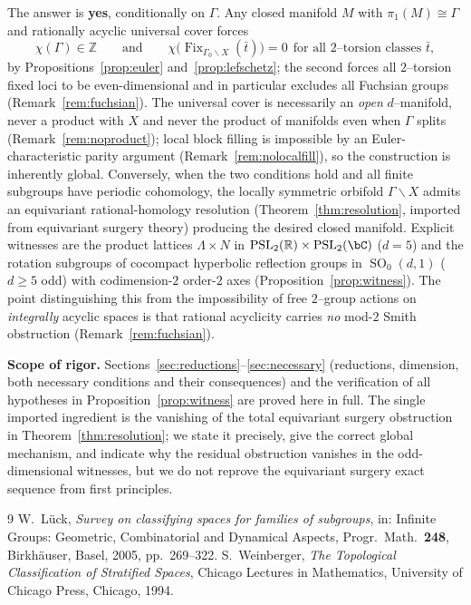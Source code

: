 \documentclass[12pt]{article}
\newcommand{\bR}{\mathbb{R}}
\newcommand{\bZ}{\mathbb{Z}}
\newcommand{\Fix}{\operatorname{Fix}}
\DeclareMathOperator{\SO}{SO}
\DeclareMathOperator{\PSL}{PSL}
\theoremstyle{definition}
\begin{document}
The answer is \textbf{yes}, conditionally on $\Gamma$.  Any closed manifold $M$
with $\pi_1(M)\cong\Gamma$ and rationally acyclic universal cover forces
\[
   \chi(\Gamma)\in\bZ
   \qquad\text{and}\qquad
   \chi\bigl(\Fix_{\Gamma_0\backslash X}(\bar t)\bigr)=0\ \ \text{for all
   $2$--torsion classes }\bar t,
\]
by Propositions~\ref{prop:euler} and~\ref{prop:lefschetz}; the second forces all
$2$--torsion fixed loci to be even-dimensional and in particular excludes all
Fuchsian groups (Remark~\ref{rem:fuchsian}).  The universal cover is necessarily
an \emph{open} $d$--manifold, never a product with $X$ and never the product of
manifolds even when $\Gamma$ splits (Remark~\ref{rem:noproduct}); local block
filling is impossible by an Euler-characteristic parity argument
(Remark~\ref{rem:nolocalfill}), so the construction is inherently global.
Conversely, when the two conditions hold and all finite subgroups have periodic
cohomology, the locally symmetric orbifold $\Gamma\backslash X$ admits an
equivariant rational-homology resolution (Theorem~\ref{thm:resolution}, imported
from equivariant surgery theory) producing the desired closed manifold.  Explicit
witnesses are the product lattices $\Lambda\times N$ in
$\PSL_2(\bR)\times\PSL_2(\bC)$ ($d=5$) and the rotation subgroups of cocompact
hyperbolic reflection groups in $\SO_0(d,1)$ ($d\ge5$ odd) with codimension-$2$
order-$2$ axes (Proposition~\ref{prop:witness}).  The point distinguishing this
from the impossibility of free $2$--group actions on \emph{integrally} acyclic
spaces is that rational acyclicity carries \emph{no} mod-$2$ Smith obstruction
(Remark~\ref{rem:fuchsian}).

\medskip
\noindent\textbf{Scope of rigor.}  Sections~\ref{sec:reductions}--\ref{sec:necessary}
(reductions, dimension, both necessary conditions and their consequences) and the
verification of all hypotheses in Proposition~\ref{prop:witness} are proved here
in full.  The single imported ingredient is the vanishing of the total equivariant
surgery obstruction in Theorem~\ref{thm:resolution}; we state it precisely, give
the correct global mechanism, and indicate why the residual obstruction vanishes
in the odd-dimensional witnesses, but we do not reprove the equivariant surgery
exact sequence from first principles.

\begin{thebibliography}{9}
W.~L\"uck, \emph{Survey on classifying spaces for families of subgroups}, in:
Infinite Groups: Geometric, Combinatorial and Dynamical Aspects, Progr.\ Math.\
\textbf{248}, Birkh\"auser, Basel, 2005, pp.\ 269--322.
S.~Weinberger, \emph{The Topological Classification of Stratified Spaces}, Chicago
Lectures in Mathematics, University of Chicago Press, Chicago, 1994.
\end{thebibliography}
\end{document}

